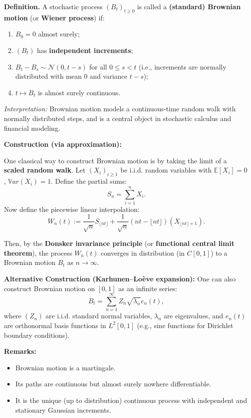 
\textbf{Definition.}  
A stochastic process \( (B_t)_{t \geq 0} \) is called a \textbf{(standard) Brownian motion} (or \textbf{Wiener process}) if:
\begin{enumerate}
  \item \( B_0 = 0 \) almost surely;
  \item \( (B_t) \) has \textbf{independent increments};
  \item \( B_t - B_s \sim \mathcal{N}(0, t - s) \) for all \( 0 \leq s < t \) (i.e., increments are normally distributed with mean 0 and variance \( t-s \));
  \item \( t \mapsto B_t \) is almost surely continuous.
\end{enumerate}

\textit{Interpretation:}  
Brownian motion models a continuous-time random walk with normally distributed steps, and is a central object in stochastic calculus and financial modeling.

\vspace{1em}
\textbf{Construction (via approximation):}

One classical way to construct Brownian motion is by taking the limit of a \textbf{scaled random walk}. Let \( (X_i)_{i \geq 1} \) be i.i.d. random variables with \( \mathbb{E}[X_i] = 0 \), \( \mathbb{V}ar(X_i) = 1 \). Define the partial sums:
\[
S_n = \sum_{i=1}^{n} X_i.
\]
Now define the piecewise linear interpolation:
\[
W_n(t) := \frac{1}{\sqrt{n}} S_{\lfloor nt \rfloor} + \frac{1}{\sqrt{n}} (nt - \lfloor nt \rfloor)(X_{\lfloor nt \rfloor + 1}).
\]

Then, by the \textbf{Donsker invariance principle} (or \textbf{functional central limit theorem}), the process \( W_n(t) \) converges in distribution (in \( C[0,1] \)) to a Brownian motion \( B_t \) as \( n \to \infty \).

\vspace{1em}
\textbf{Alternative Construction (Karhunen–Loève expansion):}  
One can also construct Brownian motion on \([0,1]\) as an infinite series:
\[
B_t = \sum_{n=1}^\infty Z_n \sqrt{\lambda_n} e_n(t),
\]
where \( (Z_n) \) are i.i.d. standard normal variables, \( \lambda_n \) are eigenvalues, and \( e_n(t) \) are orthonormal basis functions in \( L^2[0,1] \) (e.g., sine functions for Dirichlet boundary conditions).

\vspace{1em}
\textbf{Remarks:}
\begin{itemize}
  \item Brownian motion is a martingale.
  \item Its paths are continuous but almost surely nowhere differentiable.
  \item It is the unique (up to distribution) continuous process with independent and stationary Gaussian increments.
\end{itemize}